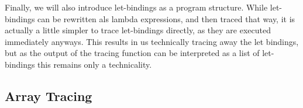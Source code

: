         \begin{prooftree}
        \end{prooftree}

        \begin{prooftree}
        \end{prooftree}

        Finally, we will also introduce let-bindings as a program structure.
        While let-bindings can be rewritten als lambda expressions, and then traced that way, it is actually a little simpler to trace let-bindings directly, as they are executed immediately anyways.
        This results in us technically tracing away the let bindings, but as the output of the tracing function can be interpreted as a list of let-bindings this remains only a technicality.

        \begin{prooftree}
        \end{prooftree}

        \begin{prooftree}
        \end{prooftree}
        
        \begin{prooftree}
        \end{prooftree}

    \subsection{Array Tracing}
    